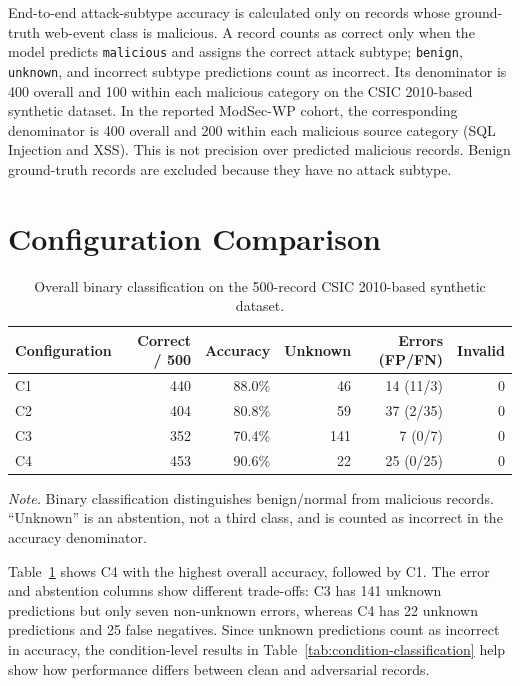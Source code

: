 End-to-end attack-subtype accuracy is calculated only on records whose
ground-truth web-event class is malicious. A record counts as correct
only when the model predicts \texttt{malicious} and assigns the correct
attack subtype; \texttt{benign}, \texttt{unknown}, and incorrect subtype
predictions count as incorrect. Its denominator is 400 overall and 100
within each malicious category on the CSIC 2010-based synthetic dataset.
In the reported ModSec-WP cohort, the corresponding denominator is 400
overall and 200 within each malicious source category (SQL Injection
and XSS). This is not precision over predicted malicious records.
Benign ground-truth records are excluded because they have no attack
subtype.

\section{Configuration Comparison}\label{configuration-comparison}

\begin{table}[H]
\centering
\caption{Overall binary classification on the 500-record CSIC 2010-based synthetic dataset.}
\label{tab:overall-classification}
\begin{tabular}{@{}lrrrrr@{}}
\toprule
Configuration & Correct / 500 & Accuracy & Unknown & Errors (FP/FN) & Invalid \\
\midrule
C1 & 440 & 88.0\% & 46 & 14 (11/3) & 0 \\
C2 & 404 & 80.8\% & 59 & 37 (2/35) & 0 \\
C3 & 352 & 70.4\% & 141 & 7 (0/7) & 0 \\
C4 & 453 & 90.6\% & 22 & 25 (0/25) & 0 \\
\bottomrule
\end{tabular}
\par\smallskip
\begin{minipage}{\textwidth}\footnotesize
\textit{Note.} Binary classification distinguishes benign/normal from
malicious records. ``Unknown'' is an abstention, not a third class, and
is counted as incorrect in the accuracy denominator.
\end{minipage}
\end{table}

Table~\ref{tab:overall-classification} shows C4 with the highest overall
accuracy, followed by C1. The error and abstention columns show different
trade-offs: C3 has 141 unknown predictions but only seven non-unknown
errors, whereas C4 has 22 unknown predictions and 25 false negatives.
Since unknown predictions count as incorrect in accuracy, the
condition-level results in Table~\ref{tab:condition-classification}
help show how performance differs between clean and adversarial records.

